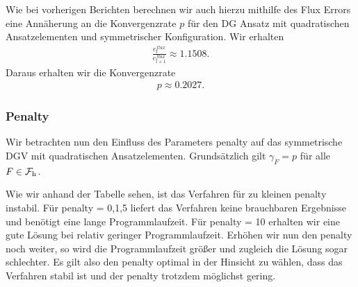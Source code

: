 Wie bei vorherigen Berichten berechnen wir auch hierzu mithilfe des Flux Errors eine Annäherung an die Konvergenzrate $p$ für den DG Ansatz mit quadratischen Ansatzelementen und symmetrischer Konfiguration.
Wir erhalten 
\begin{align*}
 \frac{e_l^{flux}}{e_{l+1}^{flux}} \approx 1.1508.
\end{align*}
Daraus erhalten wir die Konvergenzrate
\begin{align*}
  p \approx 0.2027.
\end{align*}

\subsubsection*{Penalty}
Wir betrachten nun den Einfluss des Parameters penalty auf das symmetrische DGV mit quadratischen Ansatzelementen.
Grundsätzlich gilt $ \gamma_F  = p$ für alle $ F \in \operatorname{\mathcal{F}_h} $.

\begin{figure}[H]
	\centering
\end{figure}

Wie wir anhand der Tabelle sehen, ist das Verfahren für zu kleinen penalty instabil. Für penalty = 0,1,5 liefert das Verfahren keine brauchbaren Ergebnisse und benötigt eine lange Programmlaufzeit.
Für penalty = 10 erhalten wir eine gute Lösung bei relativ geringer Programmlaufzeit. Erhöhen wir nun den penalty noch weiter, so wird die Programmlaufzeit größer und zugleich die Lösung sogar schlechter. Es gilt also den penalty optimal in der Hinsicht zu wählen, dass das Verfahren stabil ist und der penalty trotzdem möglichst gering.



